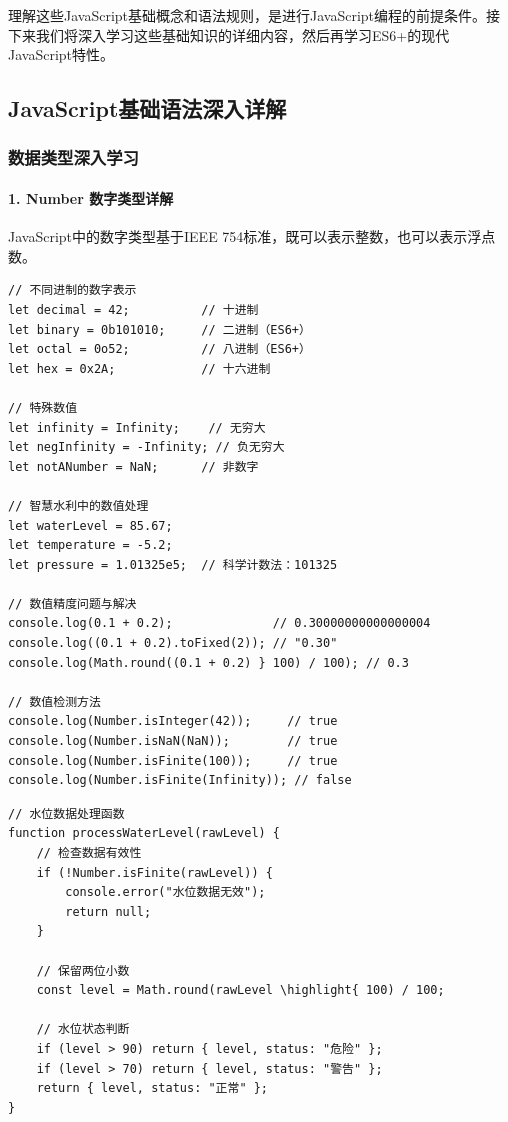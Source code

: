 理解这些JavaScript基础概念和语法规则，是进行JavaScript编程的前提条件。接下来我们将深入学习这些基础知识的详细内容，然后再学习ES6+的现代JavaScript特性。

\hypertarget{javascriptux57faux7840ux8bedux6cd5ux6df1ux5165ux8be6ux89e3}{%
\subsection{JavaScript基础语法深入详解}\label{javascriptux57faux7840ux8bedux6cd5ux6df1ux5165ux8be6ux89e3}}

\hypertarget{ux6570ux636eux7c7bux578bux6df1ux5165ux5b66ux4e60}{%
\subsubsection{数据类型深入学习}\label{ux6570ux636eux7c7bux578bux6df1ux5165ux5b66ux4e60}}

\hypertarget{number-ux6570ux5b57ux7c7bux578bux8be6ux89e3}{%
\paragraph{1. Number 数字类型详解}\label{number-ux6570ux5b57ux7c7bux578bux8be6ux89e3}}

JavaScript中的数字类型基于IEEE 754标准，既可以表示整数，也可以表示浮点数。

\begin{lstlisting}[style=javascript]
// 不同进制的数字表示
let decimal = 42;          // 十进制
let binary = 0b101010;     // 二进制（ES6+）
let octal = 0o52;          // 八进制（ES6+）
let hex = 0x2A;            // 十六进制

// 特殊数值
let infinity = Infinity;    // 无穷大
let negInfinity = -Infinity; // 负无穷大
let notANumber = NaN;      // 非数字

// 智慧水利中的数值处理
let waterLevel = 85.67;
let temperature = -5.2;
let pressure = 1.01325e5;  // 科学计数法：101325

// 数值精度问题与解决
console.log(0.1 + 0.2);              // 0.30000000000000004
console.log((0.1 + 0.2).toFixed(2)); // "0.30"
console.log(Math.round((0.1 + 0.2) } 100) / 100); // 0.3

// 数值检测方法
console.log(Number.isInteger(42));     // true
console.log(Number.isNaN(NaN));        // true
console.log(Number.isFinite(100));     // true
console.log(Number.isFinite(Infinity)); // false
\end{lstlisting}

\begin{lstlisting}[style=javascript]
// 水位数据处理函数
function processWaterLevel(rawLevel) {
    // 检查数据有效性
    if (!Number.isFinite(rawLevel)) {
        console.error("水位数据无效");
        return null;
    }
    
    // 保留两位小数
    const level = Math.round(rawLevel \highlight{ 100) / 100;
    
    // 水位状态判断
    if (level > 90) return { level, status: "危险" };
    if (level > 70) return { level, status: "警告" };
    return { level, status: "正常" };
}
\end{lstlisting}

